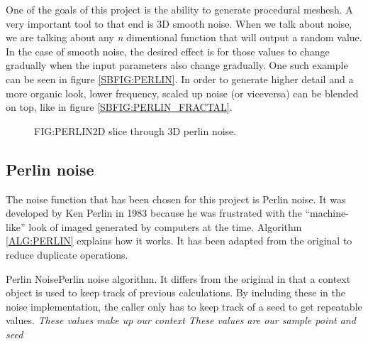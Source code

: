 One of the goals of this project is the ability to generate procedural meshesh.
A very important tool to that end is 3D smooth noise.
When we talk about noise,
we are talking about any \textit{n} dimentional function that will output a random value.
In the case of smooth noise,
the desired effect is for those values to change gradually when the input parameters also change gradually.
One such example can be seen in figure \ref{SBFIG:PERLIN}.
In order to generate higher detail and a more organic look,
lower frequency, scaled up noise (or viceversa) can be blended on top,
like in figure \ref{SBFIG:PERLIN_FRACTAL}.

\begin{figure}[Perlin noise example]{FIG:PERLIN}{2D slice through 3D perlin noise.}
\end{figure}

\subsection{Perlin noise}

The noise function that has been chosen for this project is Perlin noise.
It was developed by Ken Perlin in 1983 because he was frustrated with the ``machine-like'' look of imaged generated by computers at the time.\cite{making_noise}
Algorithm \ref{ALG:PERLIN} explains how it works.
It has been adapted from the original to reduce duplicate operations.


\begin{algorithmN}{Perlin Noise}{Perlin noise algorithm. It differs from the original in that a context object is used to keep track of previous calculations. By including these in the noise implementation, the caller only has to keep track of a seed to get repeatable values.}
  \emph{These values make up our context}\;
  \emph{These values are our sample point and seed}\;
\end{algorithmN}
